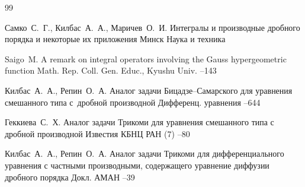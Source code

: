 



\begin{thebibliography}{99}

\by Самко~С.~Г., Килбас~А.~А., Маричев~О.~И.
\book Интегралы и производные дробного порядка и некоторые их приложения 
\publaddr Минск
\publ Наука и техника

\by Saigo~M.
\paper A remark on integral operators involving the Gauss hypergeometric function
\jour  Math. Rep. Coll. Gen. Educ., Kyushu Univ.
--143

\by Килбас~А.~А., Репин~О.~А.
\paper Аналог задачи Бицадзе--Самарского для уравнения смешанного типа с~дробной производной
\jour Дифференц. уравнения
--644

\by Геккиева~С.~Х. 
\paper Аналог задачи Трикоми для уравнения смешанного типа с дробной производной 
\jour Известия КБНЦ РАН
(7)
--80

\by Килбас~А.~А., Репин~О.~А.
\paper Аналог задачи Трикоми для дифференциального уравнения с частными производными, содержащего уравнение диффузии дробного порядка 
\jour Докл. АМАН
--39




\end{thebibliography}

